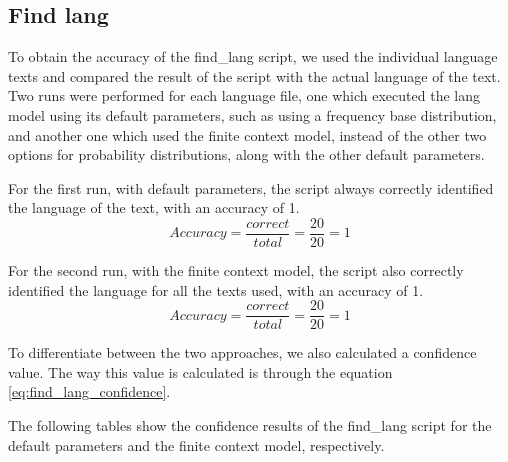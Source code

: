 \documentclass{article}
\begin{document}
\subsection{Find lang}
\label{subsec:results_find_lang}

To obtain the accuracy of the find_lang script, we used the individual language texts and compared the result of the script with the actual language of the text.
Two runs were performed for each language file, one which executed the lang model using its default parameters, such as using a frequency base distribution,
and another one which used the finite context model, instead of the other two options for probability distributions, along with the other default parameters.

For the first run, with default parameters, the script always correctly identified the language of the text, with an accuracy of 1.
\begin{equation}
    \label{eq:find_lang_default_accuracy}
    Accuracy = \frac{correct}{total} = \frac{20}{20} = 1
\end{equation}

For the second run, with the finite context model, the script also correctly identified the language for all the texts used, with an accuracy of 1.
\begin{equation}
    \label{eq:find_lang_finite_context_accuracy}
    Accuracy = \frac{correct}{total} = \frac{20}{20} = 1
\end{equation}

To differentiate between the two approaches, we also calculated a confidence value. The way this value is calculated is through the equation \ref{eq:find_lang_confidence}.

The following tables show the confidence results of the find_lang script for the default parameters and the finite context model, respectively.
\end{document}
